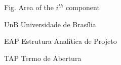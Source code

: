 \begin{siglas}
  \item[Fig.] Area of the $i^{th}$ component
  \item[UnB] Universidade de Brasília
  \item[EAP] Estrutura Analítica de Projeto
  \item[TAP] Termo de Abertura
\end{siglas}

